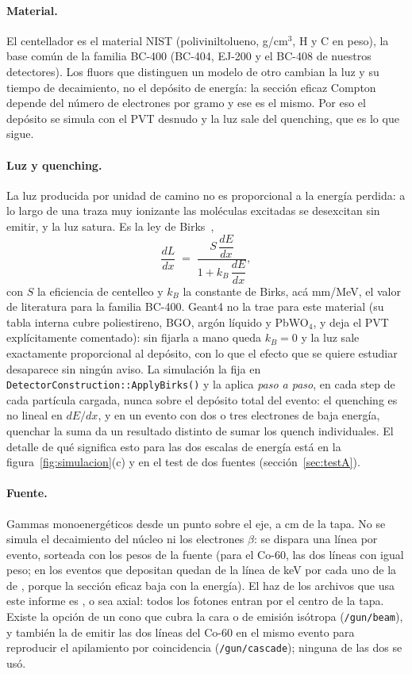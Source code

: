 \documentclass[11pt,a4paper]{article}
\begin{document}
\paragraph{Material.} El centellador es el material NIST
\SimMaterial{} (poliviniltolueno, \SimDensidad{} g/cm$^3$, H
\XcomFraccionH{} y C \XcomFraccionC{} en peso), la base común de la familia
BC-400 (BC-404, EJ-200 y el BC-408 de nuestros detectores). Los fluors que distinguen un modelo de otro
cambian la luz y su tiempo de decaimiento, no el depósito de energía: la
sección eficaz Compton depende del número de electrones por gramo y ese es el
mismo. Por eso el depósito se simula con el PVT desnudo y la luz sale del
quenching, que es lo que sigue.

\paragraph{Luz y quenching.} La luz producida por unidad de camino no es
proporcional a la energía perdida: a lo largo de una traza muy ionizante las
moléculas excitadas se desexcitan sin emitir, y la luz satura. Es la ley de
Birks~\cite{birks1951},
\[
   \frac{dL}{dx} \;=\; \frac{S\,\dfrac{dE}{dx}}{1 + k_B\,\dfrac{dE}{dx}},
\]
con $S$ la eficiencia de centelleo y $k_B$ la constante de Birks, acá
\SimBirks{} mm/MeV, el valor de literatura para la familia BC-400. Geant4 no
la trae para este material (su tabla interna cubre poliestireno, BGO, argón
líquido y PbWO$_4$, y deja el PVT explícitamente comentado): sin fijarla a
mano queda $k_B = 0$ y la luz sale exactamente proporcional al depósito, con
lo que el efecto que se quiere estudiar desaparece sin ningún aviso. La
simulación la fija en \texttt{DetectorConstruction::ApplyBirks()} y la
aplica \emph{paso a paso}, en cada step de cada partícula cargada, nunca
sobre el depósito total del evento: el quenching es no lineal en $dE/dx$, y
en un evento con dos o tres electrones de baja energía, quenchar la suma da
un resultado distinto de sumar los quench individuales. El detalle de qué
significa esto para las dos escalas de energía está en la
figura~\ref{fig:simulacion}(c) y en el test de dos fuentes
(sección~\ref{sec:testA}).

\paragraph{Fuente.} Gammas monoenergéticos desde un punto sobre el eje, a
\SimDistancia{} cm de la tapa. No se simula el decaimiento del núcleo ni los
electrones $\beta$: se dispara una línea por evento, sorteada con los pesos de
la fuente (para el Co-60, las dos líneas con igual peso; en los eventos que
depositan quedan \SimRazonLineasCo{} de la línea de \EgammaCoA{} keV por cada
uno de la de \EgammaCoB, porque la sección eficaz baja con la energía). El
haz de los archivos que usa este informe es \SimHaz, o sea axial: todos los
fotones entran por el centro de la tapa. Existe la opción de un cono que
cubra la cara o de emisión isótropa (\texttt{/gun/beam}), y también la de
emitir las dos líneas del Co-60 en el mismo evento para reproducir el
apilamiento por coincidencia (\texttt{/gun/cascade}); ninguna de las dos se
usó.
\end{document}
